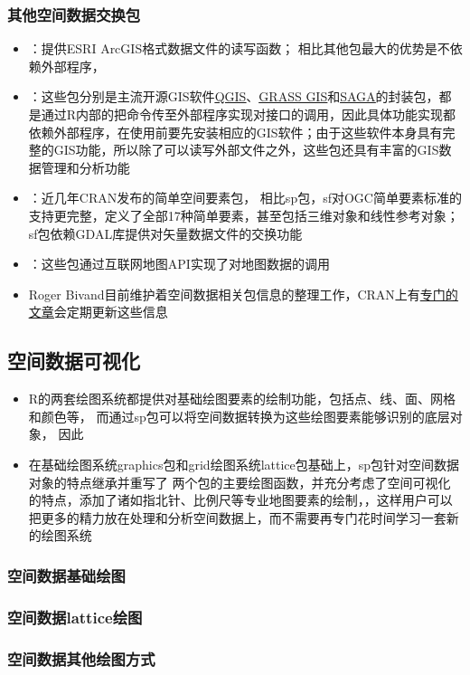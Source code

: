 \subsubsection{其他空间数据交换包}
\begin{frame}[t]{\subsecname}{\subsubsecname}
\begin{itemize} 
\item {}：提供ESRI ArcGIS格式数据文件的读写函数；
相比其他包最大的优势是不依赖外部程序，
\item {}：这些包分别是主流开源GIS软件\href{https://www.qgis.org/}{\uline{QGIS}}、\href{https://grass.osgeo.org/}{\uline{GRASS GIS}}和\href{http://www.saga-gis.org/}{\uline{SAGA}}的封装包，都是通过R内部的把命令传至外部程序实现对接口的调用，因此具体功能实现都依赖外部程序，在使用前要先安装相应的GIS软件；由于这些软件本身具有完整的GIS功能，所以除了可以读写外部文件之外，这些包还具有丰富的GIS数据管理和分析功能
\item {}：近几年CRAN发布的简单空间要素包，
相比sp包，sf对OGC简单要素标准的支持更完整，定义了全部17种简单要素，甚至包括三维对象和线性参考对象；sf包依赖GDAL库提供对矢量数据文件的交换功能
\item {}：这些包通过互联网地图API实现了对地图数据的调用
\item Roger Bivand目前维护着空间数据相关包信息的整理工作，CRAN上有\href{https://cran.r-project.org/web/views/Spatial.html}{\uline{专门的文章}}会定期更新这些信息
\end{itemize}
\end{frame}

\subsection{空间数据可视化}
\begin{frame}[t]{\subsecname}
\begin{itemize} 
\item<1-> R的两套绘图系统都提供对基础绘图要素的绘制功能，包括点、线、面、网格和颜色等，
而通过sp包可以将空间数据转换为这些绘图要素能够识别的底层对象，
因此
\item<2-> 在基础绘图系统graphics包和grid绘图系统lattice包基础上，sp包针对空间数据对象的特点继承并重写了
两个包的主要绘图函数，并充分考虑了空间可视化的特点，添加了诸如指北针、比例尺等专业地图要素的绘制，，这样用户可以把更多的精力放在处理和分析空间数据上，而不需要再专门花时间学习一套新的绘图系统
\end{itemize}
\end{frame}

\subsubsection{空间数据基础绘图}

\subsubsection{空间数据lattice绘图}

\subsubsection{空间数据其他绘图方式}